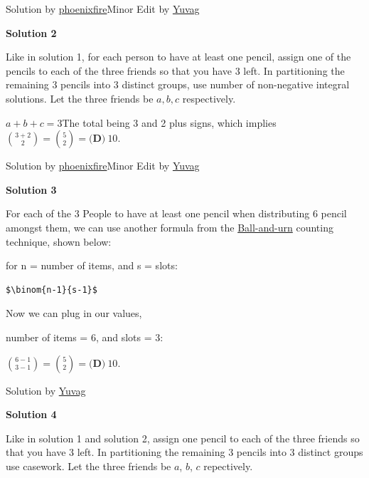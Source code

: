 \begin{enumerate}
 Solution by \href{https://artofproblemsolving.com/wiki/index.php?title=User:Phoenixfire}{phoenixfire}Minor Edit by \href{https://artofproblemsolving.com/wiki/index.php?title=User:Yuvag}{Yuvag}

 



\textbf{Solution 2}

Like in solution 1, for each person to have at least one pencil, assign one of the pencils to each of the three friends so that you have $3$ left. In partitioning the remaining $3$ pencils into $3$ distinct groups, use number of non-negative integral solutions. Let the three friends be $a, b, c$ respectively.

 $a+b+c = 3$The total being 3 and 2 plus signs, which implies$\binom{3+2}{2} = \binom{5}{2} = \boxed{\textbf{(D)}\ 10}$.

 Solution by \href{https://artofproblemsolving.com/wiki/index.php?title=User:Phoenixfire}{phoenixfire}Minor Edit by \href{https://artofproblemsolving.com/wiki/index.php?title=User:Yuvag}{Yuvag}

 



\textbf{Solution 3}

For each of the 3 People to have at least one pencil when distributing 6 pencil amongst them, we can use another formula from the \href{https://artofproblemsolving.com/wiki/index.php?title=Ball-and-urn}{Ball-and-urn} counting technique, shown below:

 for n = number of items, and s = slots:

 \begin{verbatim}
$\binom{n-1}{s-1}$
\end{verbatim}

Now we can plug in our values, 

 number of items = 6, and slots = 3:

 $\binom{6-1}{3-1}     =     \binom{5}{2}     =    \boxed{\textbf{(D)}\ 10}$.

 Solution by \href{https://artofproblemsolving.com/wiki/index.php?title=User:Yuvag}{Yuvag}

 



\textbf{Solution 4}

Like in solution 1 and solution 2, assign one pencil to each of the three friends so that you have $3$ left. In partitioning the remaining $3$ pencils into $3$ distinct groups use casework. Let the three friends be $a$, $b$, $c$ repectively.


\end{enumerate}
